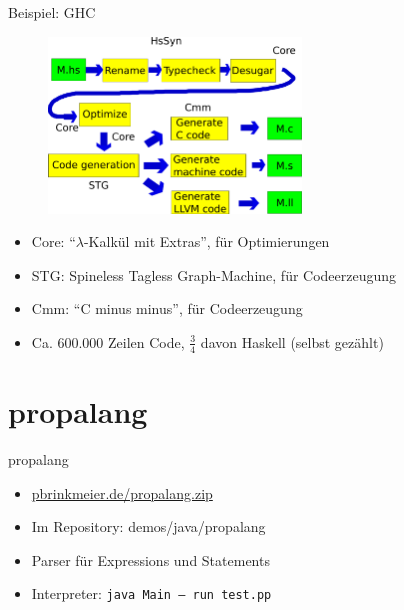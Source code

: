 \begin{frame}{Beispiel: GHC}
  \begin{figure}
    \includegraphics[width=0.6\textwidth]{images/ghc.png}
  \end{figure}

  \begin{itemize}
    \item Core: \enquote{$\lambda$-Kalkül mit Extras}, für Optimierungen
    \item STG: Spineless Tagless Graph-Machine, für Codeerzeugung
    \item Cmm: \enquote{C minus minus}, für Codeerzeugung
    \item Ca. 600.000 Zeilen Code, $\frac{3}{4}$ davon Haskell (selbst gezählt)
  \end{itemize}
\end{frame}

\section{propalang}

\begin{frame}{propalang}

  \begin{itemize}
    \item \href{https://pbrinkmeier.de/propalang.zip}{pbrinkmeier.de/propalang.zip}
    \item Im Repository: demos/java/propalang
    \item Parser für Expressions und Statements
    \item Interpreter: \texttt{java Main -- run test.pp}
  \end{itemize}
\end{frame}

